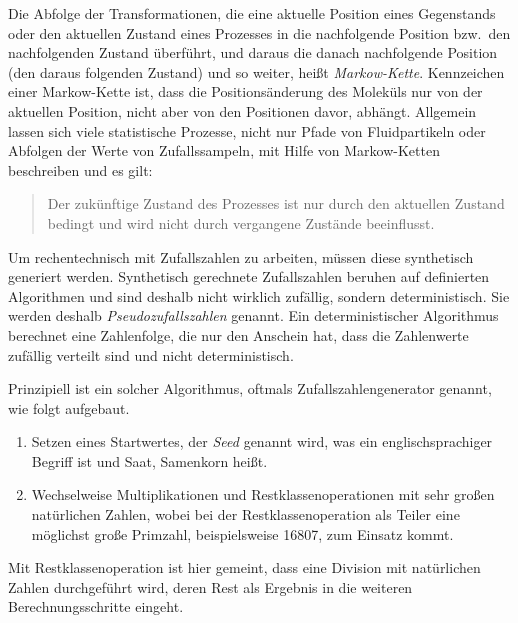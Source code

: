 Die Abfolge der Transformationen, die eine aktuelle Position eines Gegenstands oder den
aktuellen Zustand eines Prozesses in die nachfolgende Position bzw.\ den nachfolgenden
Zustand überführt, und daraus die danach nachfolgende Position (den daraus folgenden Zustand)
und so weiter, heißt \textsl{Markow-Kette}. Kennzeichen einer Markow-Kette ist, dass die 
Positions\-änder\-ung des Moleküls nur von der aktuellen Position,
nicht aber von den Positionen davor, abhängt. Allgemein lassen sich viele statistische Prozesse,
nicht nur Pfade von Fluidpartikeln oder Abfolgen der Werte von Zufallssampeln, mit Hilfe von
Markow-Ketten beschreiben und es gilt:
\begin{quote}
Der zukünftige Zustand des Prozesses ist nur durch den
aktuellen Zustand bedingt und wird nicht durch vergangene Zustände beeinflusst.
\end{quote}

Um rechentechnisch mit Zufallszahlen zu arbeiten, müssen diese synthetisch generiert werden.
Synthetisch gerechnete Zufallszahlen beruhen auf definierten Algorithmen und
sind deshalb nicht wirklich zufällig, sondern deterministisch. Sie werden deshalb
\textsl{Pseudozufallszahlen} genannt.
Ein deterministischer Algorithmus berechnet eine Zahlenfolge, die nur den
Anschein hat, dass die Zahlenwerte zufällig verteilt sind und nicht deterministisch.

Prinzipiell ist ein solcher Algorithmus, oftmals Zufallszahlengenerator genannt, wie
folgt aufgebaut.
\begin{enumerate}
\item Setzen eines Startwertes, der \textsl{Seed} genannt wird, was ein englischsprachiger
  Begriff ist und Saat, Samenkorn heißt.
\item Wechselweise Multiplikationen und Restklassenoperationen mit sehr großen natürlichen Zahlen, wobei
  bei der Restklassenoperation als Teiler eine möglichst große Primzahl, beispielsweise
  16807, zum Einsatz kommt.
\end{enumerate}
Mit Restklassenoperation ist hier gemeint, dass eine Division mit natürlichen Zahlen
durchgeführt wird, deren Rest als Ergebnis in die weiteren Berechnungsschritte eingeht.


